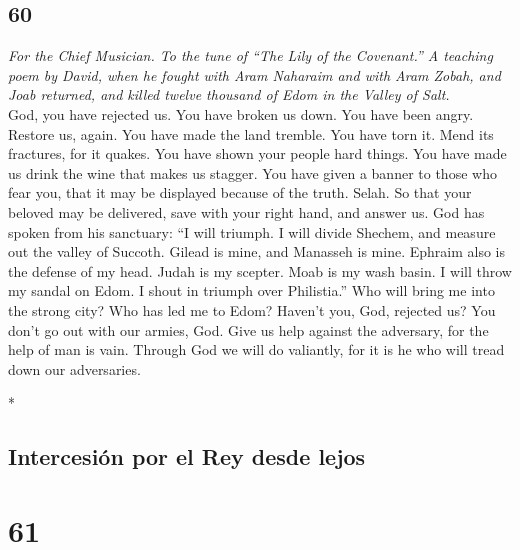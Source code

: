 \begin{paracol}{2}
\begin{otherlanguage}{english}
{\section{60}\label{section-119}}

\emph{For the Chief Musician. To the tune of ``The Lily of the
Covenant.'' A teaching poem by David, when he fought with Aram Naharaim
and with Aram Zobah, and Joab returned, and killed twelve thousand of
Edom in the Valley of Salt.}\\
 God, you have rejected us. You have broken us down. You
have been angry. Restore us, again.  You have made the
land tremble. You have torn it. Mend its fractures, for it quakes.
 You have shown your people hard things. You have made us
drink the wine that makes us stagger.  You have given a
banner to those who fear you, that it may be displayed because of the
truth. Selah.  So that your beloved may be delivered, save
with your right hand, and answer us.  God has spoken from
his sanctuary: ``I will triumph. I will divide Shechem, and measure out
the valley of Succoth.  Gilead is mine, and Manasseh is
mine. Ephraim also is the defense of my head. Judah is my scepter.
 Moab is my wash basin. I will throw my sandal on Edom. I
shout in triumph over Philistia.''  Who will bring me into
the strong city? Who has led me to Edom?  Haven't you,
God, rejected us? You don't go out with our armies, God. 
Give us help against the adversary, for the help of man is vain.
 Through God we will do valiantly, for it is he who will
tread down our adversaries.

\end{otherlanguage}

\switchcolumn[0]*

\hypertarget{intercesiuxf3n-por-el-rey-desde-lejos}{%
\subsection{Intercesión por el Rey desde
lejos}\label{intercesiuxf3n-por-el-rey-desde-lejos}}

\hypertarget{section-120}{%
\section{61}\label{section-120}}


\end{paracol}
